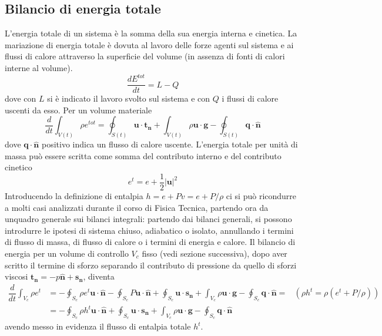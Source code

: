 \subsection{Bilancio di energia totale}
L'energia totale di un sistema è la somma della sua energia interna e cinetica. La mariazione di energia totale è dovuta al lavoro delle forze 
 agenti sul sistema e ai flussi di calore attraverso la superficie del volume (in assenza di fonti di calori interne al volume). 
\begin{equation}
 \dfrac{ d E^{tot}}{d t} = L - Q
\end{equation}
dove con $L$ si è indicato il lavoro svolto sul sistema e con $Q$ i flussi di calore uscenti da esso. Per un volume materiale
\begin{equation}
 \dfrac{d}{d t} \int_{V(t)} \rho e^{tot} = \oint_{S(t)} \bm{u} \cdot \bm{t_n} + \int_{V(t)} \rho \bm{u} \cdot \bm{g}
  - \oint_{S(t)} \bm{q} \cdot \bm{\hat{n}}
\end{equation}
dove $\bm{q} \cdot \bm{\hat{n}}$ positivo indica un flusso di calore uscente. L'energia totale per unità di massa può essere scritta come
somma del contributo interno e del contributo cinetico
\begin{equation}
 e^t = e + \dfrac{1}{2}|\bm{u}|^2
\end{equation}
Introducendo la definizione di entalpia $h = e + Pv = e + P/\rho$ ci si può ricondurre a molti casi analizzati durante il corso di 
 Fisica Tecnica, partendo ora da unquadro generale sui bilanci integrali: partendo dai bilanci generali, si possono introdurre
 le ipotesi di sistema chiuso, adiabatico o isolato, annullando i termini di flusso di massa, di flusso di calore o i termini di 
 energia e calore. Il bilancio di energia per un volume di controllo $V_c$ fisso (vedi sezione successiva), dopo aver scritto
 il termine di sforzo separando il contributo di pressione da quello di sforzi viscosi $\bm{t_n} = -p\bm{\hat{n}} + \bm{s_n}$, diventa
\begin{equation}
\begin{aligned}
\dfrac{d}{d t} \int_{V_c} \rho e^t & = - \oint_{S_c} \rho e^t \bm{u} \cdot \bm{\hat{n}}
  - \oint_{S_c} P \bm{u} \cdot \bm{\hat{n}} + \oint_{S_c} \bm{u} \cdot \bm{s_n} + \int_{V_c} \rho \bm{u} \cdot \bm{g}
  - \oint_{S_c} \bm{q} \cdot \bm{\hat{n}} = & (\rho h^t = \rho(e^t + P/\rho))\\
 & = - \oint_{S_c} \rho h^t \bm{u} \cdot \bm{\hat{n}}
   + \oint_{S_c} \bm{u} \cdot \bm{s_n} + \int_{V_c} \rho \bm{u} \cdot \bm{g}
  - \oint_{S_c} \bm{q} \cdot \bm{\hat{n}}
\end{aligned}
\end{equation}
avendo messo in evidenza il flusso di entalpia totale $h^t$.

